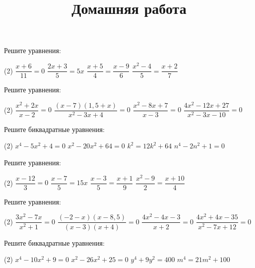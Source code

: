 \begin{consultation}
	\begin{listofex}
		\item Решите уравнения:
		\begin{tasks}(2)
			\task \( \dfrac{x+6}{11}=0 \)
			\task \( \dfrac{2x+3}{5}=5x \)
			\task \( \dfrac{x+5}{4}=\dfrac{x-9}{6} \)
			\task \( \dfrac{x^2-4}{5}=\dfrac{x+2}{7} \)
		\end{tasks}
		\item Решите уравнения:
			\begin{tasks}(2)
				\task \( \dfrac{x^2+2x}{x-2}=0 \)
				\task \( \dfrac{(x-7)(1,5+x)}{x^2-3x+4}=0 \)
				\task \( \dfrac{x^2-8x+7}{x-3}=0 \)
				\task \( \dfrac{4x^2-12x+27}{x^2-3x-10}=0 \)
			\end{tasks}
		\item Решите биквадратные уравнения:
		\begin{tasks}(2)
			\task \( x^4-5x^2+4=0 \)
			\task \( x^2-20x^2+64=0 \)
			\task \( k^2=12k^2+64 \)
			\task \( n^4-2n^2+1=0 \)
		\end{tasks}
	\end{listofex}
	\newpage
	\title{Домашняя работа}
	\begin{listofex}
		\item Решите уравнения:
		\begin{tasks}(2)
			\task \( \dfrac{x-12}{3}=0 \)
			\task \( \dfrac{x-7}{5}=15x \)
			\task \( \dfrac{x-3}{5}=\dfrac{x+1}{9} \)
			\task \( \dfrac{x^2-9}{2}=\dfrac{x+10}{4} \)
		\end{tasks}
		\item Решите уравнения:
		\begin{tasks}(2)
			\task \( \dfrac{3x^2-7x}{x^2+1}=0 \)
			\task \( \dfrac{(-2-x)(x-8,5)}{(x-3)(x+4)}=0 \)
			\task \( \dfrac{4x^2-4x-3}{x+2}=0 \)
			\task \( \dfrac{4x^2+4x-35}{x^2-7x+12}=0 \)
		\end{tasks}
		\item Решите биквадратные уравнения:
		\begin{tasks}(2)
			\task \( x^4-10x^2+9=0 \)
			\task \( x^2-26x^2+25=0 \)
			\task \( y^4+9y^2=400 \)
			\task \( m^4=21m^2+100 \)
		\end{tasks}
	\end{listofex}
\end{consultation}


